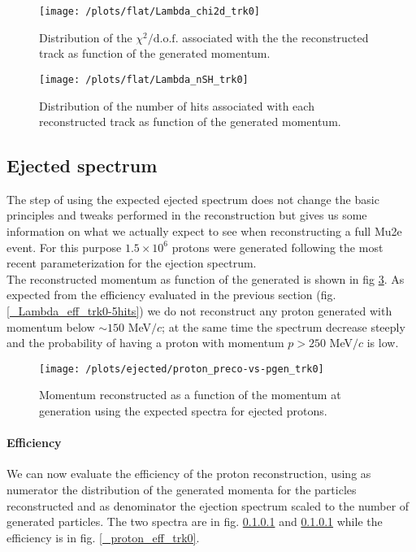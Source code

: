 \documentclass[12pt,a4paper,openright, oneside, titlepage]{book} %
\begin{document}
\begin{figure}[!htb]
\centering
\texttt{[image: /plots/flat/Lambda\_chi2d\_trk0]}
\caption{Distribution of the $\chi^2/\textrm{d.o.f.}$ associated with the the reconstructed track as function of the generated momentum.}
\label{_Lambda_chi2d_trk0}
\end{figure}

\begin{figure}[!htb]
\centering
\texttt{[image: /plots/flat/Lambda\_nSH\_trk0]}
\caption{Distribution of the number of hits associated with each reconstructed track as function of the generated momentum.}
\label{_Lambda_nSH_trk0}
\end{figure}

\subsection{Ejected spectrum}
The step of using the expected ejected spectrum does not change the basic principles and tweaks performed in the reconstruction but gives us some information on what we actually expect to see when reconstructing a full Mu2e event. 
For this purpose $1.5\times10^6$ protons were generated following the most recent parameterization for the ejection spectrum.\\
The reconstructed momentum as function of the generated is shown in fig \ref{_proton_preco-vs-pgen_trk0}. 
As expected from the efficiency evaluated in the previous section (fig. \ref{_Lambda_eff_trk0-5hits}) we do not reconstruct any proton generated with momentum below $\sim 150$ MeV$/c$; at the same time the spectrum decrease steeply and the probability of having a proton with momentum $p > 250$ MeV$/c$ is low.

\begin{figure}[!htb]
\centering
\texttt{[image: /plots/ejected/proton\_preco-vs-pgen\_trk0]}
\caption{Momentum reconstructed as a function of the momentum at generation using the expected spectra for ejected protons.}
\label{_proton_preco-vs-pgen_trk0}
\end{figure}

\paragraph{Efficiency} We can now evaluate the efficiency of the proton reconstruction, using as numerator the distribution of the generated momenta for the particles reconstructed and as denominator the ejection spectrum scaled to the number of generated particles. The two spectra are in fig. \ref{} and \ref{} while the efficiency is in fig. \ref{_proton_eff_trk0}.
\end{document}
